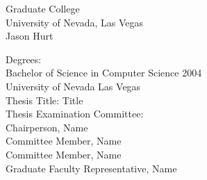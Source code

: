 \documentclass[12pt]{report}
\numberwithin{algorithm}{chapter}
\begin{document}
\thesistitlepage





\tableofcontents

\newpage
\listoftables
\listoffigures
\listofalgorithms








%
%
%
%
%

\newpage
{}   %


\newpage
\begin{thesisvita}
\begin{center}
Graduate College\\
University of Nevada, Las Vegas\\[1cm]
Jason Hurt\\[1cm]
\end{center}

\noindent Degrees:\\
\indent Bachelor of Science in Computer Science 2004\\
\indent University of Nevada Las Vegas\\

\noindent Thesis Title: Title \\

\noindent Thesis Examination Committee:\\
\indent Chairperson, Name\\
\indent Committee Member, Name\\
\indent Committee Member, Name \\
\indent Graduate Faculty Representative, Name

\end{thesisvita}
\end{document}
